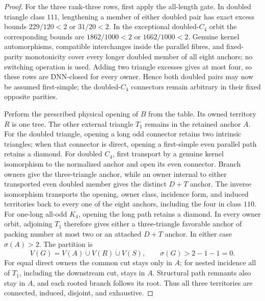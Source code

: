\documentclass[11pt]{article}
\theoremstyle{remark}
\newcommand{\sig}{\sigma}
\begin{document}
\begin{proof}
For the three rank-three rows, first apply the all-length gate.  In doubled
triangle class $111$, lengthening a member of either doubled pair has exact
excess bounds $229/120<2$ or $31/20<2$.  In the exceptional doubled-$C_4$
orbit the corresponding bounds are $1862/1000<2$ or $1662/1000<2$.
Genuine kernel automorphisms, compatible interchanges inside the parallel
fibres, and fixed-parity monotonicity cover every longer doubled member of all
eight anchors; no switching operation is used.  Adding two triangle excesses
gives at most four, so these rows are DNN-closed for every owner.  Hence both
doubled pairs may now be assumed first-simple; the doubled-$C_4$ connectors
remain arbitrary in their fixed opposite parities.

Perform the prescribed physical opening of $B$ from the table.  Its owned
territory $R$ is one tree.  The other external triangle $T_1$ remains in the
retained anchor $A$.  For the doubled triangle, opening a long odd connector
retains two intrinsic triangles; when that connector is direct, opening a
first-simple even parallel path retains a diamond.  For doubled $C_4$, first
transport by a genuine kernel isomorphism to the normalized anchor and open
its even connector.  Branch owners give the three-triangle anchor, while an
owner internal to either transported even doubled member gives the distinct
$D+T$ anchor.  The inverse isomorphism transports the opening, owner class,
incidence form, and induced territories back to every one of the eight
anchors, including the four in class $110$.  For one-long all-odd $K_4$,
opening the long path retains a diamond.  In every owner orbit, adjoining
$T_1$ therefore gives
either a three-triangle favorable anchor of packing number at most two or an
attached $D+T$ anchor.  In either case $\sig(A)>2$.  The partition is
\[
 V(G)=V(A)\mathbin{\dot\cup}V(R)\mathbin{\dot\cup}V(S),
 \qquad \sig(G)>2-1-1=0.
\]
For equal direct owners the common cut stays only in $A$; for nested incidence
all of $T_1$, including the downstream cut, stays in $A$.  Structural path
remnants also stay in $A$, and each rooted branch follows its root.  Thus all
three territories are connected, induced, disjoint, and exhaustive.


\end{proof}
\end{document}

